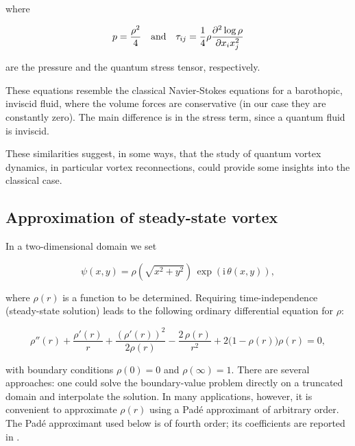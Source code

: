 where 

\[
    p = \frac{\rho^2}{4} \quad \text{and} \quad \tau_{ij} = \frac14 \rho \frac{\partial^{2} \log \rho}{\partial x_i x_j^{2}}
\]

are the pressure and the quantum stress tensor, respectively. 

These equations resemble the classical Navier-Stokes equations for a barothopic, inviscid fluid, where the volume forces are conservative (in our case they are constantly zero). The main difference is in the stress term, since a quantum fluid is inviscid. 

These similarities suggest, in some ways, that the study of quantum vortex dynamics, in particular vortex reconnections, could provide some insights into the classical case.

\subsection{Approximation of steady-state vortex}

In a two-dimensional domain we set

\[
    \psi(x,y)=\rho\left(\sqrt{x^2+y^2}\right)\,\exp\left(\mathrm{i}\,\theta(x,y)\right),
\]

where \(\rho(r)\) is a function to be determined. Requiring time-independence (steady-state solution) leads to the following ordinary differential equation for $\rho$:

\begin{equation}
    \rho''(r)+\frac{\rho'(r)}{r}+\frac{(\rho'(r))^2}{2\rho(r)}-\frac{2\,\rho(r)}{r^2}+2\bigl(1-\rho(r)\bigr)\rho(r)=0,
    \label{eq:density}
\end{equation}

with boundary conditions $\rho(0)=0$ and $\rho(\infty)=1$. There are several approaches: one could solve the boundary-value problem directly on a truncated domain and interpolate the solution. In many applications, however, it is convenient to approximate $\rho(r)$ using a Padé approximant of arbitrary order. The Padé approximant used below is of fourth order; its coefficients are reported in \cite{CZ21}.



